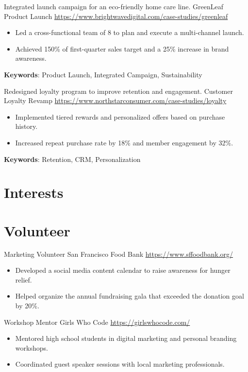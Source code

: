 \documentclass[a4paper, serif, 10pt]{moderncv}
\begin{document}
        {Integrated launch campaign for an eco-friendly home care line.}
        {GreenLeaf Product Launch}
        {\url{https://www.brightwavedigital.com/case-studies/greenleaf}}
        {}
        {\begin{itemize}
\item Led a cross-functional team of 8 to plan and execute a multi-channel launch.
\item Achieved 150\% of first-quarter sales target and a 25\% increase in brand awareness.
\end{itemize}
\textbf{Keywords}: Product Launch, Integrated Campaign, Sustainability}

        {Redesigned loyalty program to improve retention and engagement.}
        {Customer Loyalty Revamp}
        {\url{https://www.northstarconsumer.com/case-studies/loyalty}}
        {}
        {\begin{itemize}
\item Implemented tiered rewards and personalized offers based on purchase history.
\item Increased repeat purchase rate by 18\% and member engagement by 32\%.
\end{itemize}
\textbf{Keywords}: Retention, CRM, Personalization}
\section{Interests}

\section{Volunteer}

        {Marketing Volunteer}
        {San Francisco Food Bank}
        {\url{https://www.sffoodbank.org/}}
        {}
        {\begin{itemize}
\item Developed a social media content calendar to raise awareness for hunger relief.
\item Helped organize the annual fundraising gala that exceeded the donation goal by 20\%.
\end{itemize}}
    

        {Workshop Mentor}
        {Girls Who Code}
        {\url{https://girlswhocode.com/}}
        {}
        {\begin{itemize}
\item Mentored high school students in digital marketing and personal branding workshops.
\item Coordinated guest speaker sessions with local marketing professionals.
\end{itemize}}
    
\end{document}
